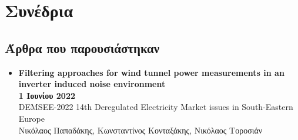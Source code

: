\documentclass[a4paper,9pt]{extarticle}
\begin{document}


\section*{Συνέδρια}

\subsection*{Άρθρα που παρουσιάστηκαν}
\begin{itemize}
  \item{\textbf{Filtering approaches for wind tunnel power measurements in an inverter
        induced noise environment}} \\
        \textbf{1 Ιουνίου 2022} \\
        DEMSEE-2022 14th Deregulated Electricity Market issues in South-Eastern Europe \\
        Νικόλαος Παπαδάκης, Κωνσταντίνος Κονταξάκης, Νικόλαος Τοροσιάν
\end{itemize}


\end{document}
